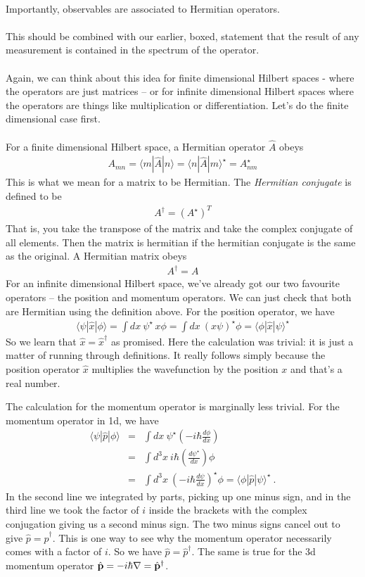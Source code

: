 \documentclass[12pt]{article}
\def\be{\begin{eqnarray}}
\def\ee{\end{eqnarray}}
\newcommand{\nn}{\nonumber}
\newcommand\para{\paragraph{}}
\newcommand{\ket}[1]{|#1\rangle}
\newcommand{\bra}[1]{\langle#1|}
\newcommand{\co}{\color{olive}}
\newcommand{\bp}{{\bf p}}
\begin{document}
{\para
{\co Importantly, observables are associated to Hermitian operators.} 

\para
This should be combined with our earlier, boxed, statement that the result of any measurement is contained in the spectrum of the operator.


\para
Again, we can think about this idea for finite dimensional Hilbert spaces - where the operators are just matrices -- or for infinite dimensional Hilbert spaces where the operators are things like multiplication or differentiation. Let's do the finite dimensional case first.

\para
{\co For a finite dimensional Hilbert space, a Hermitian operator $\hat{A}$ obeys
%
\be A_{mn} = \bra{m}\hat{A}\ket{n}= \bra{n}\hat{A}\ket{m}^\star = A_{nm}^\star\nn\ee
%
This is what we mean for a matrix to be Hermitian. The {\it Hermitian conjugate} is defined to be
%
\be A^\dagger =(A^\star)^T\nn\ee
%
} That is, you take the transpose of the matrix and take the complex conjugate of all elements. Then the matrix is hermitian if the hermitian conjugate is the same as the original. {\co A Hermitian matrix obeys
%
\be A^\dagger = A\nn\ee
%
}
For an infinite dimensional Hilbert space, we've already got our two favourite operators -- the position and momentum operators. We can just check that both are Hermitian using the definition above. 
{\co For the position operator, we have
%
\be \bra{\psi}\hat{x}\ket{\phi} = \int dx\ \psi^\star \, x\phi = \int dx\ (x \psi)^\star \phi = \bra{\phi}\hat{x}\ket{\psi}^\star\nn\ee
%
So we learn that $\hat{x} = \hat{x}^\dagger$ as promised.} Here the calculation was trivial: it is just a matter of running through definitions. It really follows simply because the position operator $\hat{x}$ multiplies the wavefunction by the position $x$ and that's a real number. 


The calculation for the momentum operator is marginally less trivial. {\co For the momentum operator in 1d, we have
%
\be \bra{\psi}\hat{p}\ket{\phi} &=& \int dx\ \psi^\star \left(-i\hbar \frac{d\phi}{dx}\right)\nn\\ &=&   \int d^3x\ i\hbar (\frac{d\psi^\star}{dx})  \phi\nn\\ &=& \int d^3x\  (-i\hbar\frac{d\psi}{dx})^\star  \phi= \bra{\phi}\hat{p}\ket{\psi}^\star\ .\ee
%
} In the second line we integrated by parts, picking up one minus sign, and in the third line we took the factor of $i$ inside the brackets with the complex conjugation giving us a second minus sign. The two minus signs cancel out to give $\hat{p} = \hat{p}^\dagger$. This is one way to see why the momentum operator necessarily comes with a factor of $i$. {\co So we have $\hat{p} = \hat{p}^\dagger$. The same is true for the 3d momentum operator $\hat{\bp} = -i\hbar\nabla = \hat{\bp}^\dagger$.}

}
\end{document}
